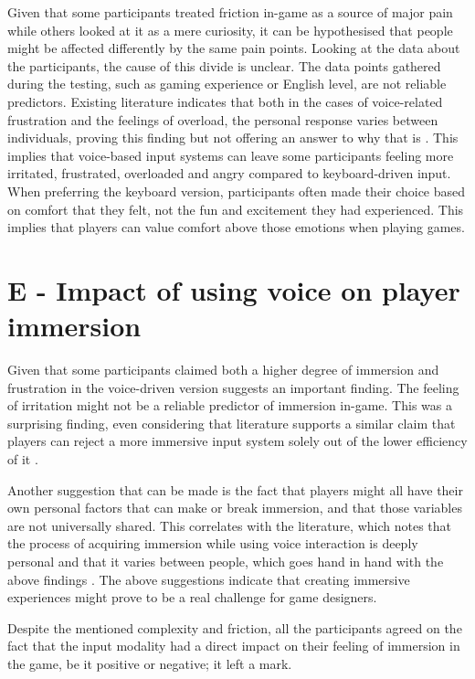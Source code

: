 Given that some participants treated friction in-game as a source of major pain while others looked at it as a mere curiosity, it can be hypothesised that people might be affected differently by the same pain points. 
Looking at the data about the participants, the cause of this divide is unclear. The data points gathered during the testing, such as gaming experience or English level, are not reliable predictors. 
Existing literature indicates that both in the cases of voice-related frustration and the feelings of overload, the personal response varies between individuals, proving this finding but not offering an answer to why that is \parencite{harneskExploringVoiceInteractions2019}.
This implies that voice-based input systems can leave some participants feeling more irritated, frustrated, overloaded and angry compared to keyboard-driven input. 
When preferring the keyboard version, participants often made their choice based on comfort that they felt, not the fun and excitement they had experienced. This implies that players can value comfort above those emotions when playing games.

\section{E - Impact of using voice on player immersion}

Given that some participants claimed both a higher degree of immersion and frustration in the voice-driven version suggests an important finding.
The feeling of irritation might not be a reliable predictor of immersion in-game.
This was a surprising finding, even considering that literature supports a similar claim that players can reject a more immersive input system solely out of the lower efficiency of it \parencite{allisonDesignPatternsVoice2018}. 

Another suggestion that can be made is the fact that players might all have their own personal factors that can make or break immersion, and that those variables are not universally shared. 
This correlates with the literature, which notes that the process of acquiring immersion while using voice interaction is deeply personal and that it varies between people, which goes hand in hand with the above findings \parencite{harneskExploringVoiceInteractions2019}.
The above suggestions indicate that creating immersive experiences might prove to be a real challenge for game designers.

Despite the mentioned complexity and friction, all the participants agreed on the fact that the input modality had a direct impact on their feeling of immersion in the game, be it positive or negative; it left a mark.